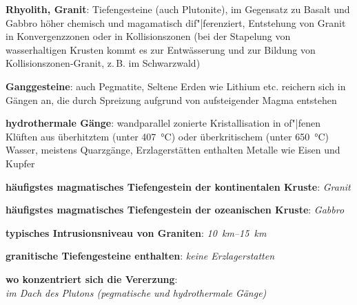 \textbf{Rhyolith, Granit}:
Tiefengesteine (auch Plutonite),
im Gegensatz zu Basalt und Gabbro höher chemisch und magamatisch dif"|ferenziert,
Entstehung von Granit in Konvergenzzonen oder in Kollisionszonen
(bei der Stapelung von wasserhaltigen Krusten kommt es zur Entwässerung
und zur Bildung von Kollisionszonen-Granit, z.\,B. im Schwarzwald)

\textbf{Ganggesteine}:
auch Pegmatite,
Seltene Erden wie Lithium etc. reichern sich in Gängen an, die durch
Spreizung aufgrund von aufsteigender Magma entstehen

\textbf{hydrothermale Gänge}:
wandparallel zonierte Kristallisation in of"|fenen Klüften aus
überhitztem (unter \SI{407}{\celsius}) oder überkritischem (unter \SI{650}{\celsius}) Wasser,
meistens Quarzgänge,
Erzlagerstätten enthalten Metalle wie Eisen und Kupfer

\begin{wichtig}
    \item
    \textbf{häufigstes magmatisches Tiefengestein der kontinentalen Kruste}:
    \emph{Granit}
    
    \item
    \textbf{häufigstes magmatisches Tiefengestein der ozeanischen Kruste}:
    \emph{Gabbro}
    
    \item
    \textbf{typisches Intrusionsniveau von Graniten}:
    \emph{\SIrange[math-rm=\mathit,text-rm=\itshape]{10}{15}{\kilo\meter}}
    
    \item
    \textbf{granitische Tiefengesteine enthalten}:
    \emph{keine Erzlagerstatten}
    
    \item
    \textbf{wo konzentriert sich die Vererzung}:\\
    \emph{im Dach des Plutons (pegmatische und hydrothermale Gänge)}
\end{wichtig}

\pagebreak
